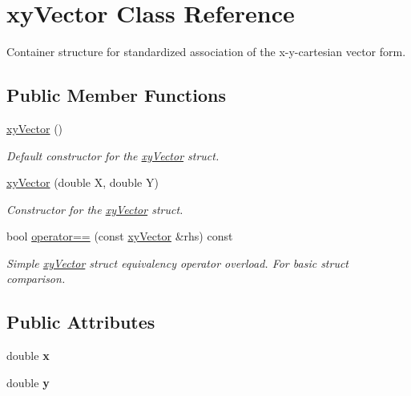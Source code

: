 \hypertarget{structxy_vector}{}\section{xy\+Vector Class Reference}
\label{structxy_vector}


Container structure for standardized association of the x-\/y-\/cartesian vector form.  


\subsection*{Public Member Functions}
\begin{DoxyCompactItemize}
\item 
\hyperlink{structxy_vector_a0ee1f276edc4c2aaf1c5973cfe150904}{xy\+Vector} ()
\begin{DoxyCompactList}\small\item\em Default constructor for the \hyperlink{structxy_vector}{xy\+Vector} struct. \end{DoxyCompactList}\item 
\hyperlink{structxy_vector_a06d9403f8df005a7ea3b7765973a93fe}{xy\+Vector} (double X, double Y)
\begin{DoxyCompactList}\small\item\em Constructor for the \hyperlink{structxy_vector}{xy\+Vector} struct. \end{DoxyCompactList}\item 
bool \hyperlink{structxy_vector_a7aca10ebc499fdf7944792741edec285}{operator==} (const \hyperlink{structxy_vector}{xy\+Vector} \&rhs) const
\begin{DoxyCompactList}\small\item\em Simple \hyperlink{structxy_vector}{xy\+Vector} struct equivalency operator overload. For basic struct comparison. \end{DoxyCompactList}\end{DoxyCompactItemize}
\subsection*{Public Attributes}
\begin{DoxyCompactItemize}
\item 
\mbox{\label{structxy_vector_a104b718a786e5743e9ab2c76a7b30bbf}} 
double {\bfseries x}
\item 
\mbox{\label{structxy_vector_a9ca5953fcf4a614693e0e56ef5f52ee4}} 
double {\bfseries y}
\end{DoxyCompactItemize}


